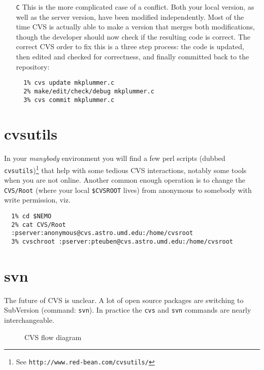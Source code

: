\begin{enumerate}
\item[{\tt C}] This is the more complicated case of a conflict. Both your local
version, as well as the server version, have been modified independently.
Most of the time CVS is actually able to make a version that merges both
modifications, though the developer should now check if the resulting code
is correct. The correct CVS order to fix this is a three step process: the
code is updated, then edited and checked for correctness, and finally
committed back to the repository:

\footnotesize\begin{verbatim}
  1% cvs update mkplummer.c
  2% make/edit/check/debug mkplummer.c
  3% cvs commit mkplummer.c
\end{verbatim}\normalsize


\end{enumerate}

\section{cvsutils}

In your {\it manybody} environment you will find a few perl scripts
(dubbed {\tt cvsutils})\footnote{See {\tt http://www.red-bean.com/cvsutils/}}
that help with some tedious CVS interactions, notably some tools when
you are not online. Another common enough operation is to change the 
{\tt CVS/Root}
(where your local {\tt \$CVSROOT} lives) from anonymous to somebody with
write permission, viz.

\footnotesize\begin{verbatim}
  1% cd $NEMO
  2% cat CVS/Root
  :pserver:anonymous@cvs.astro.umd.edu:/home/cvsroot
  3% cvschroot :pserver:pteuben@cvs.astro.umd.edu:/home/cvsroot
\end{verbatim}\normalsize

\section{svn}

The future of CVS is unclear. A lot of open source packages are  switching
to SubVersion (command: {\tt svn}). In practice the {\tt cvs} and 
{\tt svn} commands are nearly interchangeable.


\begin{figure}[htb]
\caption[CVS diagram]
{CVS flow diagram}
\label{f:cvs}
\end{figure}




